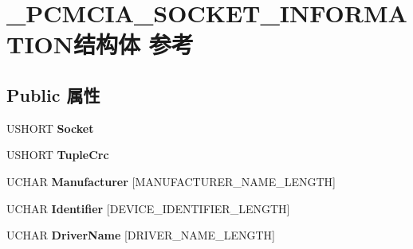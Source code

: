 \hypertarget{struct___p_c_m_c_i_a___s_o_c_k_e_t___i_n_f_o_r_m_a_t_i_o_n}{}\section{\+\_\+\+P\+C\+M\+C\+I\+A\+\_\+\+S\+O\+C\+K\+E\+T\+\_\+\+I\+N\+F\+O\+R\+M\+A\+T\+I\+O\+N结构体 参考}
\label{struct___p_c_m_c_i_a___s_o_c_k_e_t___i_n_f_o_r_m_a_t_i_o_n}
\subsection*{Public 属性}
\begin{DoxyCompactItemize}
\item 
\mbox{\label{struct___p_c_m_c_i_a___s_o_c_k_e_t___i_n_f_o_r_m_a_t_i_o_n_a4076234cc6b07f552e380f9cae143aa9}} 
U\+S\+H\+O\+RT {\bfseries Socket}
\item 
\mbox{\label{struct___p_c_m_c_i_a___s_o_c_k_e_t___i_n_f_o_r_m_a_t_i_o_n_adfc75ed90dc761a26a333601dbda3839}} 
U\+S\+H\+O\+RT {\bfseries Tuple\+Crc}
\item 
\mbox{\label{struct___p_c_m_c_i_a___s_o_c_k_e_t___i_n_f_o_r_m_a_t_i_o_n_a25c973bfac28c29606e176bf9a189ac7}} 
U\+C\+H\+AR {\bfseries Manufacturer} \mbox{[}M\+A\+N\+U\+F\+A\+C\+T\+U\+R\+E\+R\+\_\+\+N\+A\+M\+E\+\_\+\+L\+E\+N\+G\+TH\mbox{]}
\item 
\mbox{\label{struct___p_c_m_c_i_a___s_o_c_k_e_t___i_n_f_o_r_m_a_t_i_o_n_a4fd351e6d13bf9c2dab89e7d79a3b0df}} 
U\+C\+H\+AR {\bfseries Identifier} \mbox{[}D\+E\+V\+I\+C\+E\+\_\+\+I\+D\+E\+N\+T\+I\+F\+I\+E\+R\+\_\+\+L\+E\+N\+G\+TH\mbox{]}
\item 
\mbox{\label{struct___p_c_m_c_i_a___s_o_c_k_e_t___i_n_f_o_r_m_a_t_i_o_n_aae26dac55647ab626871a334b5b973df}} 
U\+C\+H\+AR {\bfseries Driver\+Name} \mbox{[}D\+R\+I\+V\+E\+R\+\_\+\+N\+A\+M\+E\+\_\+\+L\+E\+N\+G\+TH\mbox{]}
\item 

\end{DoxyCompactItemize}
